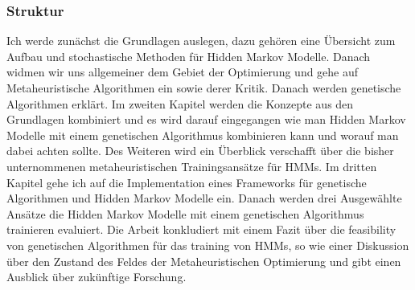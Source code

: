 \subsubsection*{Struktur}
Ich werde zunächst die Grundlagen auslegen, dazu gehören eine Übersicht zum Aufbau und stochastische Methoden für Hidden Markov Modelle. Danach widmen wir uns allgemeiner dem Gebiet der Optimierung und gehe auf Metaheuristische Algorithmen ein sowie derer Kritik. Danach werden genetische Algorithmen erklärt. Im zweiten Kapitel werden die Konzepte aus den Grundlagen kombiniert und es wird darauf eingegangen wie man Hidden Markov Modelle mit einem genetischen Algorithmus kombinieren kann und worauf man dabei achten sollte. Des Weiteren wird ein Überblick verschafft über die bisher unternommenen metaheuristischen Trainingsansätze für HMMs. Im dritten Kapitel gehe ich auf die Implementation eines Frameworks für genetische Algorithmen und Hidden Markov Modelle ein. Danach werden drei Ausgewählte Ansätze die Hidden Markov Modelle mit einem genetischen Algorithmus trainieren evaluiert. Die Arbeit konkludiert mit einem Fazit über die feasibility von genetischen Algorithmen für das training von HMMs, so wie einer Diskussion über den Zustand des Feldes der Metaheuristischen Optimierung und gibt einen Ausblick über zukünftige Forschung. 
